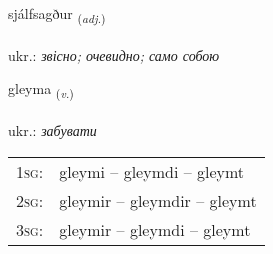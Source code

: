 \documentclass[frontgrid, backgrid]{flacards}\usepackage[]{graphicx}\usepackage[]{xcolor}
\begin{document}
\renewcommand{\flhead}{\vskip5pt \fboxsep=0pt {\small\bfseries\footnotesize Lýsingarorð | прикметник}}
\renewcommand{\fcfoot}{\vskip5pt \fboxsep=0pt \hspace{2pt}{\small\bfseries\footnotesize 1K}}

\renewcommand{\blhead}{\vskip5pt {\small\bfseries\footnotesize Lýsingarorð | прикметник }}
\renewcommand{\bcfoot}{\vskip5pt \hspace{2pt}{\small\bfseries\footnotesize 1K}}


{sjálfsagður \small{\textsubscript{(\textit{adj.})}} \\[1ex] %
\textphonetic{[sjaulfsaɣðʏr]} \\
ukr.: \emph{звісно; очевидно; само собою} \\  [2ex]
\renewcommand*{\arraystretch}{0.8}
}

\renewcommand{\flhead}{\vskip5pt \fboxsep=0pt {\small\bfseries\footnotesize Sagnorð | дієслово}}
\renewcommand{\fcfoot}{\vskip5pt \fboxsep=0pt \hspace{2pt}{\small\bfseries\footnotesize 1K}}

\renewcommand{\blhead}{\vskip5pt {\small\bfseries\footnotesize Sagnorð | дієслово }}
\renewcommand{\bcfoot}{\vskip5pt \hspace{2pt}{\small\bfseries\footnotesize 1K}}


{gleyma \small{\textsubscript{(\textit{v.})}} \\[1ex] %
\textphonetic{[kleiːma]} \\
ukr.: \emph{забувати} \\  [2ex]
\renewcommand*{\arraystretch}{0.8}
\begin{tabular}{p{1cm}l}
\textsc{1sg}: & gleymi -- gleymdi -- gleymt \\ 
\textsc{2sg}: & gleymir -- gleymdir -- gleymt \\ 
\textsc{3sg}: & gleymir -- gleymdi -- gleymt \\ 
\end{tabular}
}
\end{document}
